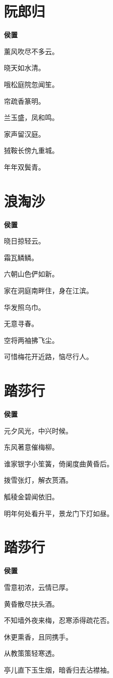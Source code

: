 \documentclass[12pt,a4paper]{ctexbook}
\begin{document}
\section{阮郎归}
\textbf{侯置}\par\vspace{0.5em}
薰风吹尽不多云。\par
晓天如水清。\par
哦松庭院忽闻笙。\par
帘疏香篆明。\par
兰玉盛，凤和鸣。\par
家声留汉庭。\par
狨鞍长傍九重城。\par
年年双鬓青。\par

\section{浪淘沙}
\textbf{侯置}\par\vspace{0.5em}
晓日掠轻云。\par
霜瓦鳞鳞。\par
六朝山色俨如新。\par
家在洞庭南畔住，身在江滨。\par
华发照乌巾。\par
无意寻春。\par
空将两袖拂飞尘。\par
可惜梅花开近路，恼尽行人。\par

\section{踏莎行}
\textbf{侯置}\par\vspace{0.5em}
元夕风光，中兴时候。\par
东风著意催梅柳。\par
谁家银字小笙簧，倚阑度曲黄昏后。\par
拨雪张灯，解衣贳酒。\par
觚稜金碧闻依旧。\par
明年何处看升平，景龙门下灯如昼。\par

\section{踏莎行}
\textbf{侯置}\par\vspace{0.5em}
雪意初浓，云情已厚。\par
黄昏散尽扶头酒。\par
不知墙外夜来梅，忍寒添得疏花否。\par
休更熏香，且同携手。\par
从教策策轻寒透。\par
亭儿直下玉生烟，暗香归去沾襟袖。\par
\end{document}
